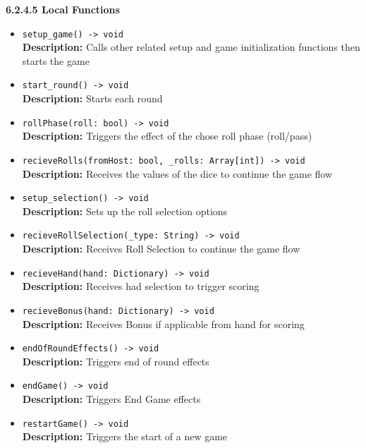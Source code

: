 \documentclass[12pt, titlepage]{article}
\begin{document}
\textbf{6.2.4.5 Local Functions}
\begin{itemize}
    \item \texttt{setup\_game() -> void}\\
    \textbf{Description:} Calls other related setup and game initialization functions then starts the game 
    
    \item \texttt{start\_round() -> void}\\
    \textbf{Description:} Starts each round
    
    \item \texttt{rollPhase(roll: bool) -> void}\\
    \textbf{Description:} Triggers the effect of the chose roll phase (roll/pass)
    
    \item \texttt{recieveRolls(fromHost: bool, \_rolls: Array[int]) -> void}\\
    \textbf{Description:} Receives the values of the dice to continue the game flow
    
    \item \texttt{setup\_selection() -> void}\\
    \textbf{Description:} Sets up the roll selection options
    
    \item \texttt{recieveRollSelection(\_type: String) -> void}\\
    \textbf{Description:} Receives Roll Selection to continue the game flow
    
    \item \texttt{recieveHand(hand: Dictionary) -> void}\\
    \textbf{Description:} Receives had selection to trigger scoring
    
    \item \texttt{recieveBonus(hand: Dictionary) -> void}\\
    \textbf{Description:} Receives Bonus if applicable from hand for scoring
    
    \item \texttt{endOfRoundEffects() -> void}\\
    \textbf{Description:} Triggers end of round effects
    
    \item \texttt{endGame() -> void}\\
    \textbf{Description:}  Triggers End Game effects
    
    \item \texttt{restartGame() -> void}\\
    \textbf{Description:} Triggers the start of a new game
    

\end{itemize}
\end{document}
